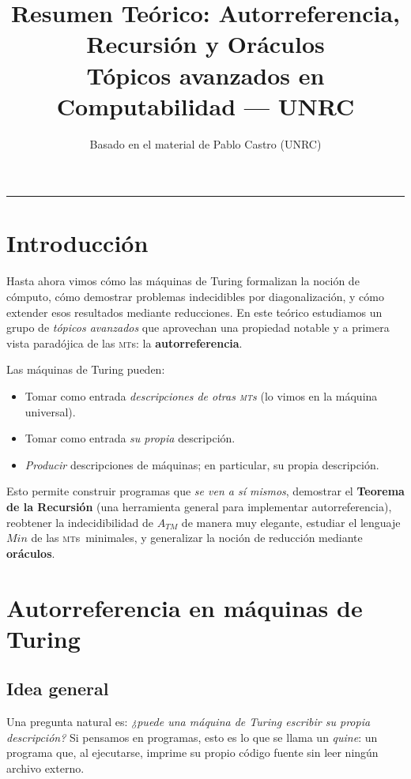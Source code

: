 \documentclass[11pt,a4paper]{article}
\title{\textbf{Resumen Teórico: Autorreferencia, Recursión y Oráculos}\\[0.3em]
\large Tópicos avanzados en Computabilidad --- UNRC}
\author{Basado en el material de Pablo Castro (UNRC)}
\date{}
\theoremstyle{definicion}
\newcommand{\MTs}{\textsc{mt}s}
\begin{document}
\maketitle

\tableofcontents

\vspace{1em}
\hrule
\vspace{1em}

\section{Introducción}

Hasta ahora vimos cómo las máquinas de Turing formalizan la noción de cómputo, cómo demostrar problemas indecidibles por diagonalización, y cómo extender esos resultados mediante reducciones. En este teórico estudiamos un grupo de \emph{tópicos avanzados} que aprovechan una propiedad notable y a primera vista paradójica de las \MTs: la \textbf{autorreferencia}.

Las máquinas de Turing pueden:
\begin{itemize}
    \item Tomar como entrada \emph{descripciones de otras \MTs} (lo vimos en la máquina universal).
    \item Tomar como entrada \emph{su propia} descripción.
    \item \emph{Producir} descripciones de máquinas; en particular, su propia descripción.
\end{itemize}

Esto permite construir programas que \emph{se ven a sí mismos}, demostrar el \textbf{Teorema de la Recursión} (una herramienta general para implementar autorreferencia), reobtener la indecidibilidad de $A_{TM}$ de manera muy elegante, estudiar el lenguaje $\mathit{Min}$ de las \MTs\ minimales, y generalizar la noción de reducción mediante \textbf{oráculos}.

\section{Autorreferencia en máquinas de Turing}

\subsection{Idea general}

Una pregunta natural es: \emph{¿puede una máquina de Turing escribir su propia descripción?} Si pensamos en programas, esto es lo que se llama un \emph{quine}: un programa que, al ejecutarse, imprime su propio código fuente sin leer ningún archivo externo.
\end{document}
